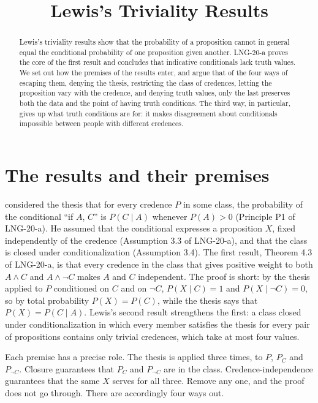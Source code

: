 \documentclass{situationist-preprint}
\title{Lewis's Triviality Results}
\begin{document}
\maketitle

\begin{abstract}
Lewis's triviality results show that the probability of a proposition cannot in general equal the conditional probability of one proposition given another. LNG-20-a proves the core of the first result and concludes that indicative conditionals lack truth values. We set out how the premises of the results enter, and argue that of the four ways of escaping them, denying the thesis, restricting the class of credences, letting the proposition vary with the credence, and denying truth values, only the last preserves both the data and the point of having truth conditions. The third way, in particular, gives up what truth conditions are for: it makes disagreement about conditionals impossible between people with different credences.
\end{abstract}

\section{The results and their premises}

\citet{Lewis1976} considered the thesis that for every credence $P$ in some class, the probability of the conditional \enquote{if $A$, $C$} is $P(C \mid A)$ whenever $P(A) > 0$ (Principle P1 of LNG-20-a). He assumed that the conditional expresses a proposition $X$, fixed independently of the credence (Assumption 3.3 of LNG-20-a), and that the class is closed under conditionalization (Assumption 3.4). The first result, Theorem 4.3 of LNG-20-a, is that every credence in the class that gives positive weight to both $A \wedge C$ and $A \wedge \neg C$ makes $A$ and $C$ independent. The proof is short: by the thesis applied to $P$ conditioned on $C$ and on $\neg C$, $P(X \mid C) = 1$ and $P(X \mid \neg C) = 0$, so by total probability $P(X) = P(C)$, while the thesis says that $P(X) = P(C \mid A)$. Lewis's second result strengthens the first: a class closed under conditionalization in which every member satisfies the thesis for every pair of propositions contains only trivial credences, which take at most four values.

Each premise has a precise role. The thesis is applied three times, to $P$, $P_C$ and $P_{\neg C}$. Closure guarantees that $P_C$ and $P_{\neg C}$ are in the class. Credence-independence guarantees that the same $X$ serves for all three. Remove any one, and the proof does not go through. There are accordingly four ways out.
\end{document}
